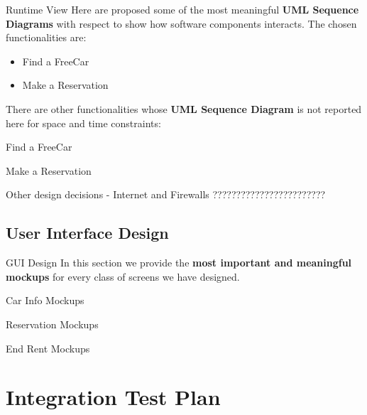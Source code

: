 \documentclass{../Common/Structure/pdf_presentation}
\begin{document}
	\begin{frame}{Runtime View}
		Here are proposed some of the most meaningful \textbf{UML Sequence Diagrams} with respect to show how software components interacts.
		The chosen functionalities are:
		\begin{itemize}
			\item Find a FreeCar
			\item Make a Reservation
		\end{itemize}
		There are other functionalities whose \textbf{UML Sequence Diagram} is not reported here for space and time constraints:
	\end{frame}
	\begin{frame}{Find a FreeCar}
	\end{frame}
	\begin{frame}{Make a Reservation}
	\end{frame}
	\begin{frame}{Other design decisions - Internet and Firewalls}
????????????????????????
	\end{frame}

	\subsection{User Interface Design}
	\begin{frame}{GUI Design}
		In this section we provide the \textbf{most important and meaningful mockups} for every class of screens we have designed.
	\end{frame}
	\begin{frame}{Car Info Mockups}
	\end{frame}
	\begin{frame}{Reservation Mockups}
	\end{frame}
	\begin{frame}{End Rent Mockups}
	\end{frame}
	\section{Integration Test Plan}
\end{document}
